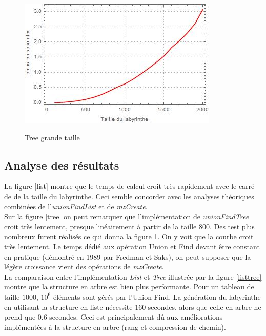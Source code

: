 \documentclass[10pt]{article}
\begin{document}
\begin{figure}[ht]
\begin{minipage}[h]{0.4\textwidth}
  \label{listtree}   
  \end{minipage}
  \hfill
  \begin{minipage}[h]{0.4\textwidth}
  \caption{Tree grande taille}
    \includegraphics[width=\textwidth]{Tree_big_graph.jpg}
  \label{treebig}
  \end{minipage}
\end{figure}

\subsection{Analyse des résultats}
La figure \ref{list} montre que le temps de calcul croit très rapidement avec le carré de de la taille du labyrinthe. Ceci semble concorder avec les analyses théoriques combinées de l'\emph{unionFindList} et de \emph{mzCreate}.
\\

Sur la figure \ref{tree} on peut remarquer que l'implémentation de \emph{unionFindTree} croit très lentement, presque linéairement à partir de la taille 800. Des test plus nombreux furent réalisés ce qui donna la figure \ref{treebig}. On y voit que la courbe croit très lentement. Le temps dédié aux opération Union et Find devant être constant en pratique (démontré en 1989 par Fredman et Saks), on peut supposer que la légère croissance vient des opérations de \emph{mzCreate}.
\\

La comparaison entre l'implémentation \emph{List} et \emph{Tree} illustrée par la figure \ref{listtree} montre que la structure en arbre est bien plus performante. Pour un tableau de taille $1000$, $10^{6}$ éléments sont gérés par l'Union-Find. La génération du labyrinthe en utilisant la structure en liste nécessite 160 secondes, alors que celle en arbre ne prend que 0.6 secondes. Ceci est principalement dû aux améliorations implémentées à la structure en arbre (rang et compression de chemin).
\end{document}
